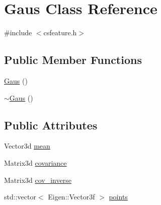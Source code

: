 \hypertarget{class_gaus}{\section{\-Gaus \-Class \-Reference}
\label{class_gaus}
}


{\ttfamily \#include $<$csfeature.\-h$>$}

\subsection*{\-Public \-Member \-Functions}
\begin{DoxyCompactItemize}
\item 
\hyperlink{class_gaus_a7b1b3f592dfd16745ba33a413737a040}{\-Gaus} ()
\item 
\hyperlink{class_gaus_ab23ea104f11c3cfacab79429426e3cb8}{$\sim$\-Gaus} ()
\end{DoxyCompactItemize}
\subsection*{\-Public \-Attributes}
\begin{DoxyCompactItemize}
\item 
\-Vector3d \hyperlink{class_gaus_a6704c416a9e7c8a8555be8a4c4212242}{mean}
\item 
\-Matrix3d \hyperlink{class_gaus_a9cfd18796f63e6816b79ab0305ca922e}{covariance}
\item 
\-Matrix3d \hyperlink{class_gaus_a7f25ee8f8347d0f35d6ea1c395b457ef}{cov\-\_\-inverse}
\item 
std\-::vector$<$ \-Eigen\-::\-Vector3f $>$ \hyperlink{class_gaus_aeadf1a4aa0690cf976d7954f51dda832}{points}
\end{DoxyCompactItemize}


